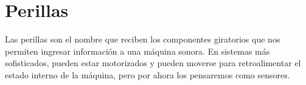 \documentclass[../principal.tex]{subfiles}
\begin{document}
\chapter{Perillas}

Las perillas son el nombre que reciben los componentes giratorios que nos permiten ingresar información a una máquina sonora. En sistemas más sofisticados, pueden estar motorizados y pueden moverse para retroalimentar el estado interno de la máquina, pero por ahora los pensaremos como sensores.

\newpage
\end{document}
